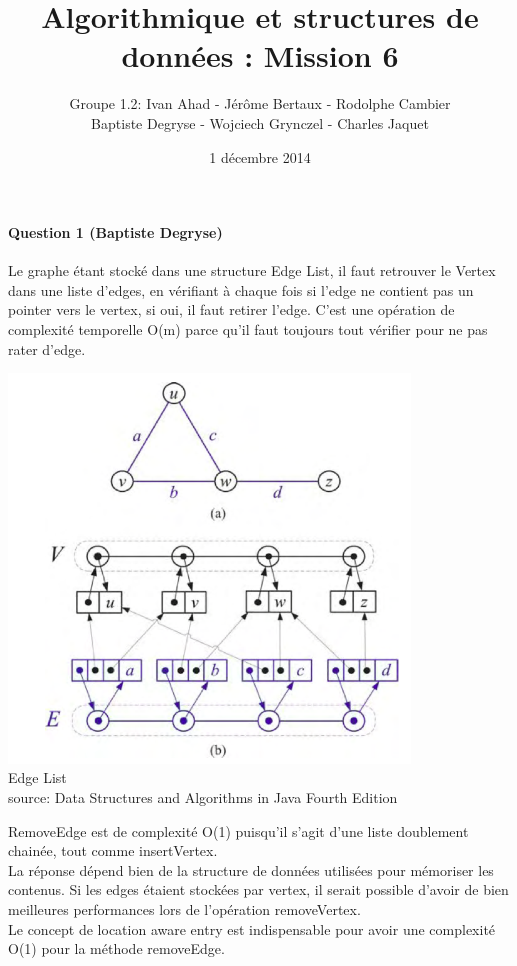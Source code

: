 \documentclass[a4paper]{article}
\title{Algorithmique et structures de données : Mission 6}
\date{1 décembre 2014}
\author{Groupe 1.2: Ivan Ahad - Jérôme Bertaux - Rodolphe Cambier \\ 
	Baptiste Degryse - Wojciech Grynczel - Charles Jaquet}
\begin{document}
\maketitle
\paragraph{Question 1 (Baptiste Degryse)}
Le graphe étant stocké dans une structure Edge List, il faut retrouver le Vertex dans une liste d'edges, en vérifiant à chaque fois si l'edge ne contient pas un pointer vers le vertex, si oui, il faut retirer l'edge. C'est une opération de complexité temporelle O(m) parce qu'il faut toujours tout vérifier pour ne pas rater d'edge.\\
\begin{center}
\includegraphics[width=0.8\textwidth]{edgeslist.png}\\
Edge List\\
source: Data Structures and Algorithms in Java Fourth Edition
\end{center}
RemoveEdge est de complexité O(1) puisqu'il s'agit d'une liste doublement chainée, tout comme insertVertex.\\

La réponse dépend bien de la structure de données utilisées pour mémoriser les contenus. Si les edges étaient stockées par vertex, il serait possible d'avoir de bien meilleures performances lors de l'opération removeVertex.\\

Le concept de location aware entry est indispensable pour avoir une complexité O(1) pour la méthode removeEdge.
\end{document}
